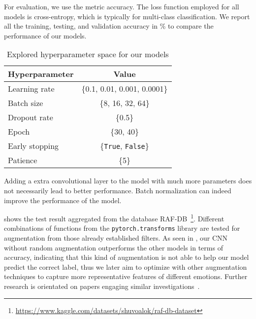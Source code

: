 For evaluation, we use the metric accuracy. 
The loss function employed for all models is cross-entropy, which is typically for multi-class classification. 
We report all the training, testing, and validation accuracy in \% to compare the performance of our models. 

\begin{table}%
  \centering
  \begin{tabular}{@{}lc@{}}
    \toprule
    Hyperparameter & Value \\
    \midrule
    Learning rate & \{0.1, 0.01, 0.001, 0.0001\}  \\
    Batch size & \{8, 16, 32, 64\} \\
    Dropout rate & \{0.5\} \\
    Epoch & \{30, 40\} \\
    Early stopping & \{\texttt{True}, \texttt{False}\} \\
    Patience & \{5\} \\
    \bottomrule
  \end{tabular}
  \caption{Explored hyperparameter space for our models}
  \label{tab:hyper}
\end{table}

Adding a extra convolutional layer to the model with much more parameters does not necessarily lead to better performance.
Batch normalization can indeed improve the performance of the model. 


 shows the test result aggregated from the database RAF-DB~\footnote{\url{https://www.kaggle.com/datasets/shuvoalok/raf-db-dataset}}. 
Different combinations of functions from the \texttt{pytorch.transforms} library are tested for augmentation from those already established filters. %
As seen in , 
our CNN without random augmentation outperforms the other models in terms of accuracy, 
indicating that this kind of augmentation is not able to help our model predict the correct label, 
thus we later aim to optimize with other augmentation techniques to capture more representative features of different emotions.
Further research is orientated on papers engaging similar investigations~\cite{ZeilerF14,li_reliable_2017,VermaMRMV23}.

